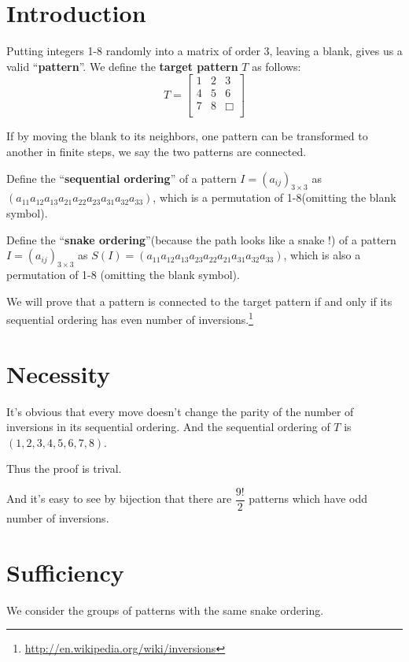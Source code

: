 
\section{Introduction}
Putting integers 1-8 randomly into a matrix of order 3, leaving a blank, gives us
a valid ``\textbf{pattern}''. We define the \textbf{target pattern} $ T$ as follows:
\[ T = \begin{bmatrix}
  1 & 2 & 3    \\
  4 & 5 & 6    \\
  7 & 8 & \Box \\
\end{bmatrix}\]

If by moving the blank to its neighbors, one pattern can be transformed to another
in finite steps, we say the two patterns are connected.

Define the ``\textbf{sequential ordering}'' of a pattern $ I = (a_{ij})_{3\times3}$
as $(a_{11}a_{12}a_{13}a_{21}a_{22}a_{23}a_{31}a_{32}a_{33})$, which is a
permutation of 1-8(omitting the blank symbol).

Define the ``\textbf{snake ordering}''(because the path looks like a snake !) of a pattern $ I = (a_{ij})_{3\times3}$
as $S(I) = (a_{11}a_{12}a_{13}a_{23}a_{22}a_{21}a_{31}a_{32}a_{33})$, which is also a
permutation of 1-8 (omitting the blank symbol).

We will prove that a pattern is connected to the target pattern if and only if
its sequential ordering has even number of inversions.\footnote{\url{http://en.wikipedia.org/wiki/inversions}}

\section{Necessity}
It's obvious that every move doesn't change the parity of the number of inversions in its sequential ordering.
And the sequential ordering of $ T$ is $ (1,2,3,4,5,6,7,8)$.

Thus the proof is trival.

And it's easy to see by bijection that there are $ \dfrac{9!}{2}$ patterns which have odd number of inversions.

\section{Sufficiency}

We consider the groups of patterns with the same snake ordering.

